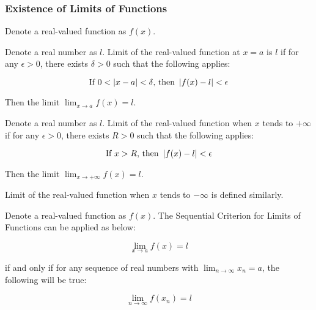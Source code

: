 \documentclass[a4paper,12pt]{article}
\begin{document}
\subsubsection{Existence of Limits of Functions}
\begin{thm}
  Denote a real-valued function as $f(x)$.
  \begin{alist}
    \item Denote a real number as $l$. Limit of the real-valued function at $x=a$ is $l$ if for any $\epsilon>0$, there exists $\delta>0$ such that the following applies:

    $$\text{If }0<\left| x-a\right|<\delta\text{, then }\left| f(x)-l\right|<\epsilon$$\s

    Then the limit $\lim_{x\to a}f(x)=l$.

    \item Denote a real number as $l$. Limit of the real-valued function when $x$ tends to $+\infty$ if for any $\epsilon>0$, there exists $R>0$ such that the following applies:

    $$\text{If }x>R\text{, then }\left| f(x)-l\right|<\epsilon$$\s

    Then the limit $\lim_{x\to+\infty}f(x)=l$.
  \end{alist}
\end{thm}\n

Limit of the real-valued function when $x$ tends to $-\infty$ is defined similarly.\n

\begin{thm}
  Denote a real-valued function as $f(x)$. The Sequential Criterion for Limits of Functions can be applied as below:

  $$\lim_{x\to a}f(x)=l$$\s

  if and only if for any sequence of real numbers with $\lim_{n\to\infty}x_{n}=a$, the following will be true:

  $$\lim_{n\to\infty}f(x_{n})=l$$
\end{thm}
\end{document}
